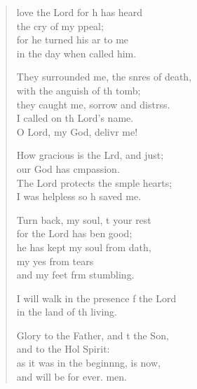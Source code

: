 \settowidth{\versewidth}{They surrounded me, the snares of death, *}
\begin{verse}%
  \begin{patverse}
 love the Lord for h has heard\Med\\
the cry of my ppeal;\\
for he turned his ar to me\Med\\
in the day when  called him.

They surrounded me, the snres of death,\Med\\
with the anguish of th tomb;\\
they caught me, sorrow and distrss.\Flex\\
I called on th Lord’s name.\Med\\
O Lord, my God, delivr me!

How gracious is the Lrd, and just;\Med\\
our God has cmpassion.\\
The Lord protects the s\pointup{\i}mple hearts;\Med\\
I was helpless so h saved me.

Turn back, my soul, t your rest\Med\\
for the Lord has ben good;\\
he has kept my soul from dath,\Flex\\
my yes from tears\Med\\
and my feet frm stumbling.

I will walk in the presence f the Lord\Med\\
in the land of th living.

Glory to the Father, and t the Son,\Med\\
and to the Hol Spirit:\\
as it was in the beginn\pointup{\i}ng, is now,\Med\\
and will be for ever. men.
  \end{patverse}
\end{verse}
